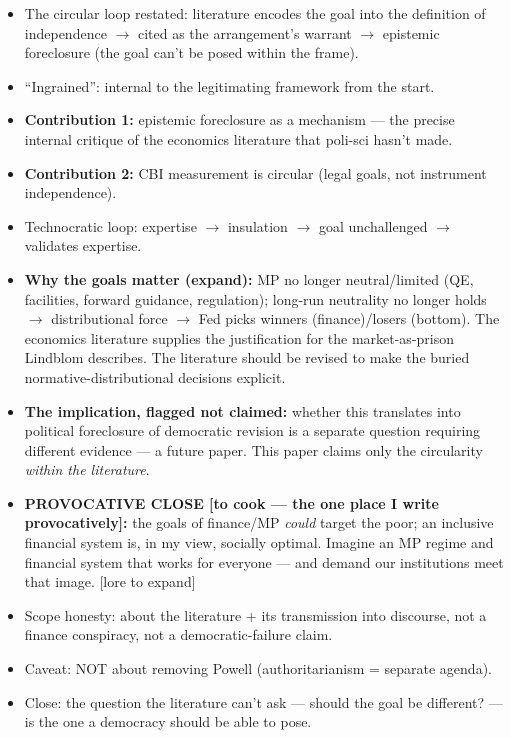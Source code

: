 \documentclass[12pt,a4paper]{article}
\begin{document}
\begin{doublespace}
\begin{itemize}
    \item The circular loop restated: literature encodes the goal into the definition of independence $\rightarrow$ cited as the arrangement's warrant $\rightarrow$ epistemic foreclosure (the goal can't be posed within the frame).
    \item ``Ingrained'': internal to the legitimating framework from the start.
    \item \textbf{Contribution 1:} epistemic foreclosure as a mechanism --- the precise internal critique of the economics literature that poli-sci hasn't made.
    \item \textbf{Contribution 2:} CBI measurement is circular (legal goals, not instrument independence).
    \item Technocratic loop: expertise $\rightarrow$ insulation $\rightarrow$ goal unchallenged $\rightarrow$ validates expertise.
    \item \textbf{Why the goals matter (expand):} MP no longer neutral/limited (QE, facilities, forward guidance, regulation); long-run neutrality no longer holds $\rightarrow$ distributional force $\rightarrow$ Fed picks winners (finance)/losers (bottom). The economics literature supplies the justification for the market-as-prison Lindblom describes. The literature should be revised to make the buried normative-distributional decisions explicit.
    \item \textbf{The implication, flagged not claimed:} whether this translates into political foreclosure of democratic revision is a separate question requiring different evidence --- a future paper. This paper claims only the circularity \textit{within the literature}.
    \item \textbf{PROVOCATIVE CLOSE [to cook --- the one place I write provocatively]:} the goals of finance/MP \textit{could} target the poor; an inclusive financial system is, in my view, socially optimal. Imagine an MP regime and financial system that works for everyone --- and demand our institutions meet that image. [lore to expand]
    \item Scope honesty: about the literature + its transmission into discourse, not a finance conspiracy, not a democratic-failure claim.
    \item Caveat: NOT about removing Powell (authoritarianism = separate agenda).
    \item Close: the question the literature can't ask --- should the goal be different? --- is the one a democracy should be able to pose.
\end{itemize}


\end{doublespace}
\end{document}
